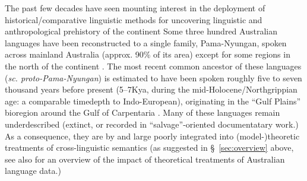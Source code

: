 \documentclass[11pt,dvipsnames]{report}
\begin{document}
The past few decades have seen mounting interest in the deployment of historical\slash{}comp\-arative linguistic methods for uncovering linguistic and anthropological prehistory of the continent \citetext{\citealp[see][]{McConvell2011} for an overview.} Some three hundred Australian languages have been reconstructed to a single family, Pama-Nyungan, spoken across mainland Australia (approx. 90\% of its area) except for some regions in the north of the continent \citep{Dixon1980,Bowern2021}. The most recent common ancestor of these languages (\textit{sc. proto-Pama-Nyungan}) is estimated to have been spoken roughly five to seven thousand years before present (5--7Kya, during the mid-Holocene/Northgrippian age: a comparable timedepth to Indo-European), originating in the ``Gulf Plains'' bioregion around the Gulf of Carpentaria \citetext{\citealp{Bouckaert2018}, supporting earlier work, incl. \citealp{Hale1964} a.o.}. Many of these languages remain underdescribed (extinct, or recorded in ``salvage''-oriented documentatary work.) As a consequence, they are by and large poorly integrated into (model-)theoretic treatments of cross-linguistic semantics (as suggested in \S~\ref{sec:overview} above, see also \citealp{Nordlinger2021} for an overview of the impact of theoretical treatments of Australian language data.)
\end{document}
